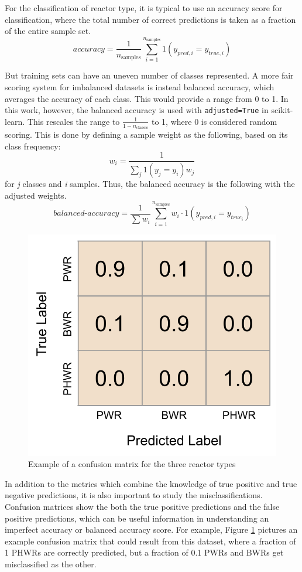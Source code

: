 For the classification of reactor type, it is typical to use an accuracy score
for classification, where the total number of correct predictions is taken as a
fraction of the entire sample set.
\begin{equation}
  \textit{accuracy} = \frac{1}{n_\text{samples}} \sum_{i=1}^{n_\text{samples}} 
                      1(y_{pred,i} = y_{true,i})
\end{equation}

But training sets can have an uneven number of classes represented.  A more
fair scoring system for imbalanced datasets is instead balanced accuracy, which
averages the accuracy of each class. This would provide a range from 0 to 1. In
this work, however, the balanced accuracy is used with \texttt{adjusted=True}
in scikit-learn. This rescales the range to $\frac{1}{1-n_\text{classes}}$ to
1, where 0 is considered random scoring.  This is done by defining a sample
weight as the following, based on its class frequency: \cite{scikit}
\begin{equation}
  w_i = \frac{1}{\sum_j{1(y_j = y_i) w_j}}
\end{equation}
for \textit{j} classes and \textit{i} samples. Thus, the balanced accuracy is 
the following with the adjusted weights.
\begin{equation}
  \textit{balanced-accuracy} = \frac{1}{\sum{w_i}} \sum_{i=1}^{n_\text{samples}} 
                               w_i \cdot 1(y_{pred, i} = y_{true_i})
\end{equation}

\begin{figure}[!htb]
  \centering
  \includegraphics[width=0.4\linewidth]{./chapters/litrev/cm_example.png}
  \caption{Example of a confusion matrix for the three reactor types}
  \label{fig:cm_ex}
\end{figure}

In addition to the metrics which combine the knowledge of true positive and
true negative predictions, it is also important to study the
misclassifications. Confusion matrices show the both the true positive
predictions and the false positive predictions, which can be useful information
in understanding an imperfect accuracy or balanced accuracy score. For example,
Figure \ref{fig:cm_ex} pictures an example confusion matrix that could result
from this dataset, where a fraction of 1 \gls{PHWR}s are correctly predicted,
but a fraction of 0.1 \gls{PWR}s and \gls{BWR}s get misclassified as the other. 

